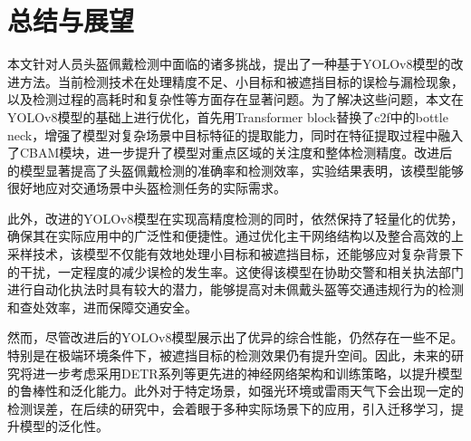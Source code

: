 \documentclass[journal]{IEEEtran}
\numberwithin{figure}{section}%
\begin{document}
\section{总结与展望}
本文针对人员头盔佩戴检测中面临的诸多挑战，提出了一种基于YOLOv8模型的改进方法。当前检测技术在处理精度不足、小目标和被遮挡目标的误检与漏检现象，以及检测过程的高耗时和复杂性等方面存在显著问题。为了解决这些问题，本文在YOLOv8模型的基础上进行优化，首先用Transformer block替换了c2f中的bottle neck，增强了模型对复杂场景中目标特征的提取能力，同时在特征提取过程中融入了CBAM模块，进一步提升了模型对重点区域的关注度和整体检测精度。改进后的模型显著提高了头盔佩戴检测的准确率和检测效率，实验结果表明，该模型能够很好地应对交通场景中头盔检测任务的实际需求。\par
此外，改进的YOLOv8模型在实现高精度检测的同时，依然保持了轻量化的优势，确保其在实际应用中的广泛性和便捷性。通过优化主干网络结构以及整合高效的上采样技术，该模型不仅能有效地处理小目标和被遮挡目标，还能够应对复杂背景下的干扰，一定程度的减少误检的发生率。这使得该模型在协助交警和相关执法部门进行自动化执法时具有较大的潜力，能够提高对未佩戴头盔等交通违规行为的检测和查处效率，进而保障交通安全。\par
然而，尽管改进后的YOLOv8模型展示出了优异的综合性能，仍然存在一些不足。特别是在极端环境条件下，被遮挡目标的检测效果仍有提升空间。因此，未来的研究将进一步考虑采用DETR系列等更先进的神经网络架构和训练策略，以提升模型的鲁棒性和泛化能力。此外对于特定场景，如强光环境或雷雨天气下会出现一定的检测误差，在后续的研究中，会着眼于多种实际场景下的应用，引入迁移学习，提升模型的泛化性。



%
\end{document}
